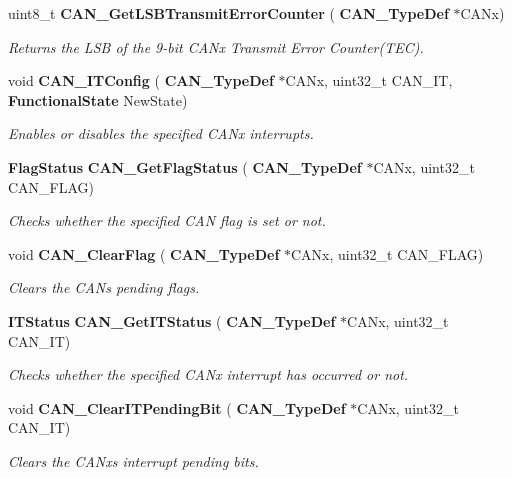 \begin{DoxyCompactItemize}
uint8\+\_\+t \textbf{ C\+A\+N\+\_\+\+Get\+L\+S\+B\+Transmit\+Error\+Counter} (\textbf{ C\+A\+N\+\_\+\+Type\+Def} $\ast$C\+A\+Nx)
\begin{DoxyCompactList}\small\item\em Returns the L\+SB of the 9-\/bit C\+A\+Nx Transmit Error Counter(\+T\+E\+C). \end{DoxyCompactList}\item 
void \textbf{ C\+A\+N\+\_\+\+I\+T\+Config} (\textbf{ C\+A\+N\+\_\+\+Type\+Def} $\ast$C\+A\+Nx, uint32\+\_\+t C\+A\+N\+\_\+\+IT, \textbf{ Functional\+State} New\+State)
\begin{DoxyCompactList}\small\item\em Enables or disables the specified C\+A\+Nx interrupts. \end{DoxyCompactList}\item 
\textbf{ Flag\+Status} \textbf{ C\+A\+N\+\_\+\+Get\+Flag\+Status} (\textbf{ C\+A\+N\+\_\+\+Type\+Def} $\ast$C\+A\+Nx, uint32\+\_\+t C\+A\+N\+\_\+\+F\+L\+AG)
\begin{DoxyCompactList}\small\item\em Checks whether the specified C\+AN flag is set or not. \end{DoxyCompactList}\item 
void \textbf{ C\+A\+N\+\_\+\+Clear\+Flag} (\textbf{ C\+A\+N\+\_\+\+Type\+Def} $\ast$C\+A\+Nx, uint32\+\_\+t C\+A\+N\+\_\+\+F\+L\+AG)
\begin{DoxyCompactList}\small\item\em Clears the C\+AN\textquotesingle{}s pending flags. \end{DoxyCompactList}\item 
\textbf{ I\+T\+Status} \textbf{ C\+A\+N\+\_\+\+Get\+I\+T\+Status} (\textbf{ C\+A\+N\+\_\+\+Type\+Def} $\ast$C\+A\+Nx, uint32\+\_\+t C\+A\+N\+\_\+\+IT)
\begin{DoxyCompactList}\small\item\em Checks whether the specified C\+A\+Nx interrupt has occurred or not. \end{DoxyCompactList}\item 
void \textbf{ C\+A\+N\+\_\+\+Clear\+I\+T\+Pending\+Bit} (\textbf{ C\+A\+N\+\_\+\+Type\+Def} $\ast$C\+A\+Nx, uint32\+\_\+t C\+A\+N\+\_\+\+IT)
\begin{DoxyCompactList}\small\item\em Clears the C\+A\+Nx\textquotesingle{}s interrupt pending bits. \end{DoxyCompactList}\end{DoxyCompactItemize}


